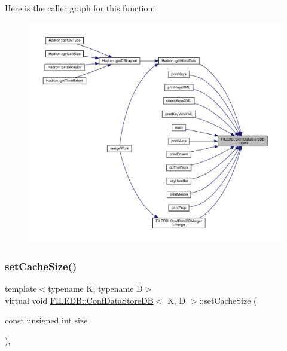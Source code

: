 Here is the caller graph for this function\+:
\nopagebreak
\begin{figure}[H]
\begin{center}
\leavevmode
\includegraphics[width=350pt]{d8/d19/classFILEDB_1_1ConfDataStoreDB_ab87e2fb12067bfb19c1f381a433fd442_icgraph}
\end{center}
\end{figure}
\mbox{\label{classFILEDB_1_1ConfDataStoreDB_af432d4a9c6dfb21a6ccb1969343cb4fa}} 
\subsubsection{\texorpdfstring{setCacheSize()}{setCacheSize()}\hspace{0.1cm}{\footnotesize\ttfamily [1/3]}}
{\footnotesize\ttfamily template$<$typename K, typename D$>$ \\
virtual void \mbox{\hyperlink{classFILEDB_1_1ConfDataStoreDB}{F\+I\+L\+E\+D\+B\+::\+Conf\+Data\+Store\+DB}}$<$ K, D $>$\+::set\+Cache\+Size (\begin{DoxyParamCaption}\item[{const unsigned int}]{size }\end{DoxyParamCaption})\hspace{0.3cm}{\ttfamily [inline]}, {\ttfamily [virtual]}}

